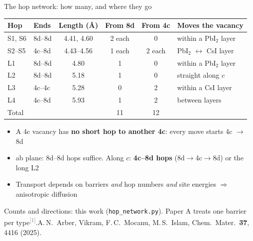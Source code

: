 \documentclass[aspectratio=169,10pt]{beamer}
\newcommand{\cit}[1]{\textsuperscript{\textcolor{gray}{[#1]}}}
\newcommand{\refs}[1]{\par\vfill\begingroup\tiny\color{gray}\raggedright #1\par\endgroup}
\newcommand{\RA}{[1] A.\,N.~Arber, Vikram, F.\,C.~Mocanu, M.\,S.~Islam, Chem.\ Mater.\ \textbf{37}, 4416 (2025).}
\begin{document}
\begin{frame}{The hop network: how many, and where they go}
  \centering\footnotesize
  \begin{tabular}{llcccl}
    \toprule
    Hop & Ends & Length (\AA) & From 8d & From 4c & Moves the vacancy \\
    \midrule
    S1, S6 & 8d--8d & 4.41, 4.60 & 2 each & 0 & within a PbI$_2$ layer \\
    S2--S5 & 4c--8d & 4.43--4.56 & 1 each & 2 each & PbI$_2$ $\leftrightarrow$ CsI layer \\
    L1 & 8d--8d & 4.80 & 1 & 0 & within a PbI$_2$ layer \\
    L2 & 8d--8d & 5.18 & 1 & 0 & straight along $c$ \\
    L3 & 4c--4c & 5.28 & 0 & 2 & within a CsI layer \\
    L4 & 4c--8d & 5.93 & 1 & 2 & between layers \\
    \midrule
    Total & & & 11 & 12 & \\
    \bottomrule
  \end{tabular}

  \vspace{0.3em}
  \raggedright\footnotesize
  \begin{itemize}
    \item A 4c vacancy has \textbf{no short hop to another 4c}: every move starts 4c $\rightarrow$ 8d
    \item ab plane: 8d--8d hops suffice. Along $c$: \textbf{4c--8d hops} (8d$\rightarrow$4c$\rightarrow$8d) or the long L2
    \item Transport depends on barriers \emph{and} hop numbers \emph{and} site energies $\Rightarrow$ anisotropic diffusion
  \end{itemize}
  \refs{Counts and directions: this work (\texttt{hop\_network.py}). Paper A treats one barrier per type\cit{1}.\quad \RA}
\end{frame}
\end{document}
